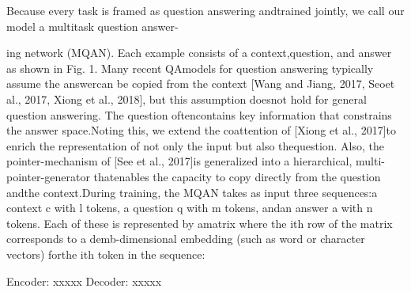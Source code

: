 Because  every  task  is  framed  as  question  answering  andtrained jointly, we call our model a multitask question answer-

ing  network  (MQAN).  Each  example  consists  of  a  context,question,  and  answer  as  shown  in  Fig.  1.  Many  recent  QAmodels  for  question  answering  typically  assume  the  answercan  be  copied  from  the  context  [Wang  and  Jiang,  2017,  Seoet  al.,  2017,  Xiong  et  al.,  2018],  but  this  assumption  doesnot  hold  for  general  question  answering.  The  question  oftencontains  key  information  that  constrains  the  answer  space.Noting this, we extend the coattention of [Xiong et al., 2017]to enrich the representation of not only the input but also thequestion.  Also,  the  pointer-mechanism  of  [See  et  al.,  2017]is generalized into a hierarchical, multi-pointer-generator thatenables  the  capacity  to  copy  directly  from  the  question  andthe context.During training, the MQAN takes as input three sequences:a  context  c  with  l  tokens,  a  question  q  with  m  tokens,  andan answer a with n tokens. Each of these is represented by amatrix where the ith row of the matrix corresponds to a demb-dimensional embedding (such as word or character vectors) forthe ith token in the sequence:

Encoder:
xxxxx
Decoder:
xxxxx
